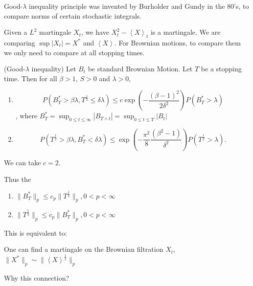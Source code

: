 
Good-$\lambda$ inequality principle was invented by Burholder and Gundy in the 80's, to compare norms of certain stochastic integrals.

Given a $L^2$ martingale $X_t$, we have $X_t^2 - \left\langle X \right\rangle _t$ is a martingale. We are comparing $\sup |X_t| = X^* $ and $\left\langle X \right\rangle $. For Brownian motions, to compare them we only need to compare at all stopping times.

\begin{theorem}
	\label{thm:BDGprev}(Good-$\lambda$ inequality)
	Let $B_t$ be standard Brownian Motion. Let $T$ be a stopping time. Then for all $\beta > 1$, $S>0$ and $\lambda>0$,
	\begin{enumerate}
		\item
			\[
				P\left( B_T^* > \beta \lambda, T^{\frac{1}{2}} \le  \delta \lambda \right) \le c \exp\left( - \frac{(\beta - 1)^2}{2 \delta^2} \right) P(B_T^* > \lambda)
			\]
			, where $B_T^* = \sup _{0 \le t \le \infty } |B_{T \wedge t}| = \sup _{0 \le  t \le  T} |B_t|$
		\item 
			\[
				P(T^{\frac{1}{2}} > \beta \lambda, B_T^* < \delta \lambda) \le \exp\left( - \frac{\pi^2}{8} \frac{(\beta^2 - 1)}{\delta^2}  \right) P(T^{\frac{1}{2}} > \lambda)
			.\] 
	\end{enumerate}
\end{theorem}
We can take $c = 2$.

Thus the 
\begin{enumerate}
	\item $\|B_T^*\|_p \le  c_p \|T^{\frac{1}{2}}\|_p, 0 < p < \infty $
	\item $\|T^{\frac{1}{2}}\|_p \le  c_p \|B_T^*\|_p, 0 < p < \infty $
\end{enumerate}
This is equivalent to:
\begin{claim}
	One can find a martingale on the Brownian filtration $X_t$,  $\|X^*\|_{p} \sim \|\left\langle X \right\rangle ^{\frac{1}{2}} \|_p$
\end{claim}
 Why this connection?

